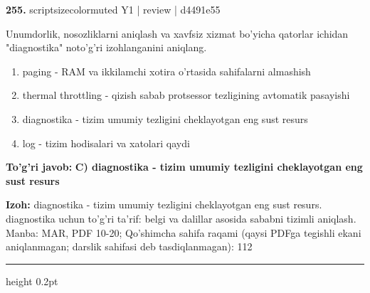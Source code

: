 \documentclass[10pt,a4paper]{article}
\begin{document}
{\bfseries\sffamily\color{ink} 255.} {scriptsizecolor{muted} Y1 | review | d4491e55}
\par
Unumdorlik, nosozliklarni aniqlash va xavfsiz xizmat bo'yicha qatorlar ichidan "diagnostika" noto'g'ri izohlanganini aniqlang.
\begin{enumerate}[label=\Alph*),leftmargin=9mm]
\item paging - RAM va ikkilamchi xotira o'rtasida sahifalarni almashish
\item thermal throttling - qizish sabab protsessor tezligining avtomatik pasayishi
\item diagnostika - tizim umumiy tezligini cheklayotgan eng sust resurs
\item log - tizim hodisalari va xatolari qaydi
\end{enumerate}
\begin{tcolorbox}[enhanced,breakable,colback=teal!4,colframe=teal!60!black,boxrule=0.45pt,arc=1.2mm,left=2.7mm,right=2.7mm,top=1.8mm,bottom=1.8mm,before skip=2mm,after skip=2mm]
{\bfseries\sffamily\color{teal}To'g'ri javob:} \textbf{C) diagnostika - tizim umumiy tezligini cheklayotgan eng sust resurs}
\par\smallskip
{\bfseries Izoh:} diagnostika - tizim umumiy tezligini cheklayotgan eng sust resurs. diagnostika uchun to'g'ri ta'rif: belgi va dalillar asosida sababni tizimli aniqlash. Manba: MAR, PDF 10-20; Qo'shimcha sahifa raqami (qaysi PDFga tegishli ekani aniqlanmagan; darslik sahifasi deb tasdiqlanmagan): 112
\end{tcolorbox}
\vspace{2mm}\hrule height 0.2pt\vspace{3mm}
\end{document}
